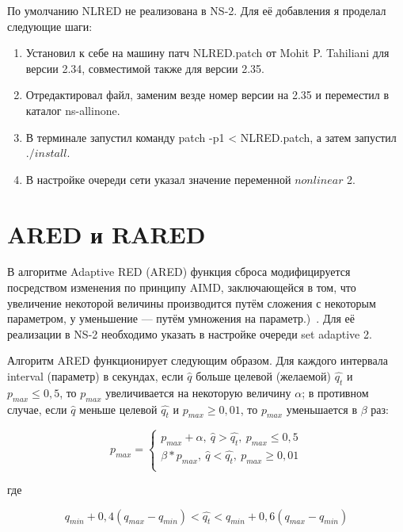 По умолчанию NLRED не реализована в NS-2. Для её добавления я проделал следующие шаги:

\begin{enumerate}
\item Установил к себе на машину патч NLRED.patch от Mohit P. Tahiliani для версии 2.34, совместимой также для версии 2.35.
\item Отредактировал файл, заменим везде номер версии на 2.35 и переместил в каталог ns-allinone.
\item В терминале запустил команду patch -p1 < NLRED.patch, а затем запустил $./install$.
\item В настройке очереди сети указал значение переменной $nonlinear$ 2.
\end{enumerate}
 
\section{ARED и RARED}

В алгоритме Adaptive RED (ARED) функция сброса модифицируется посредством изменения по принципу AIMD, заключающейся в том, что увеличение некоторой величины производится путём сложения с некоторым параметром, у уменьшение — путём умножения на параметр.)~\cite{RARED}. Для её реализации в NS-2 необходимо указать в настройке очереди set adaptive 2.

Алгоритм ARED функционирует следующим образом. Для каждого интервала interval (параметр) в секундах, если $\hat{q}$  больше целевой (желаемой) $\hat{q_t}$ и $p_{max} \leqslant 0,5$, то $p_{max}$  увеличивается на некоторую величину $\alpha$; в противном случае, если $\hat{q}$ меньше целевой $\hat{q_t}$ и $p_{max}\geqslant0,01$, то $p_{max}$  уменьшается в $\beta$ раз:

$$
p_{max} = \left\{ \begin{array}{c}
p_{max}+\alpha, \ \hat{q}>\hat{q_{t}}, \ p_{max} \leqslant0,5 \\
\beta * p_{max}, \ \hat{q}<\hat{q_{t}}, \ p_{max} \geqslant0,01 \\
\end{array} \right.
$$

где

$$
q_{min}+0,4(q_{max}-q_{min}) < \hat{q_t} < q_{min}+0,6(q_{max}-q_{min})
$$

